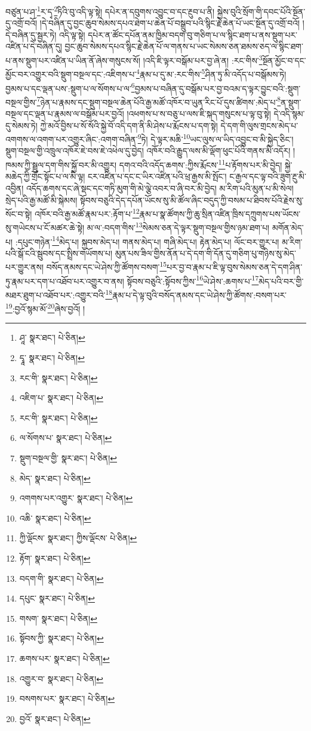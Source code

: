 བཙུན་པ་ཤ་\footnote{ཤཱ་  སྣར་ཐང་།  པེ་ཅིན། }ར་དྭ་\footnote{དྭཱ་  སྣར་ཐང་།  པེ་ཅིན། }ཏིའི་བུ་འདི་ལྟ་སྟེ། དཔེར་ན་དབུགས་འབྱུང་བ་དང་རྔུབ་པ་ནི། སྐྱེས་བུའི་སྲོག་གི་དབང་པོའི་སྔོན་དུ་འགྲོ་བའོ། །དེ་བཞིན་དུ་བྱང་ཆུབ་སེམས་དཔའ་ཐེག་པ་ཆེན་པོ་བསྒྲུབ་པའི་སྙིང་རྗེ་ཆེན་པོ་ཡང་སྔོན་དུ་འགྲོ་བའོ། །དེ་བཞིན་དུ་སྦྱར་ཏེ། འདི་ལྟ་སྟེ། དཔེར་ན་ཚོང་དཔོན་ནམ་ཁྱིམ་བདག་བུ་གཅིག་པ་ལ་སྙིང་ཐག་པ་ནས་སྡུག་པར་འཛིན་པ་དེ་བཞིན་དུ། བྱང་ཆུབ་སེམས་དཔའ་སྙིང་རྗེ་ཆེན་པོ་ལ་གནས་པ་ཡང་སེམས་ཅན་ཐམས་ཅད་ལ་སྙིང་ཐག་པ་ནས་སྡུག་པར་འཛིན་པ་ཡིན་ནོ་ཞེས་གསུངས་སོ། །འདི་ཇི་ལྟར་བསྒོམ་པར་བྱ་ཞེ་ན། :རང་གིས་\footnote{རང་གི་  སྣར་ཐང་།  པེ་ཅིན། }སྔོན་མྱོང་བ་དང་མྱོང་བར་འགྱུར་བའི་སྡུག་བསྔལ་དང་:འཇིགས་པ་\footnote{འཇིག་པ་  སྣར་ཐང་།  པེ་ཅིན། }རྣམ་པ་དུ་མ་:རང་གིས་\footnote{རང་གི་  སྣར་ཐང་།  པེ་ཅིན། }ཤིན་ཏུ་མི་འདོད་པ་བསྒོམས་ཏེ། བྱམས་པ་དང་ལྡན་པས་:སྡུག་པ་ལ་སོགས་པ་ལ་\footnote{ལ་སོགས་པ་  སྣར་ཐང་།  པེ་ཅིན། }བྱམས་པ་བཞིན་དུ་བསྒོམ་པར་བྱ་བའམ་ད་ལྟར་བྱུང་བའི་:སྡུག་བསྔལ་གྱིས་\footnote{སྡུག་བསྔལ་གྱི་  སྣར་ཐང་།  པེ་ཅིན། }ཉེན་པ་རྣམས་དང་སྡུག་བསྔལ་ཆེན་པོའི་རྒྱ་མཚོ་འཁོར་བ་ཡུན་རིང་པོ་དུས་ཚིགས་:མེད་པ་\footnote{མེད་  སྣར་ཐང་།  པེ་ཅིན། }ན་སྡུག་བསྔལ་དང་ལྡན་པ་རྣམས་ལ་བསྒོམ་པར་བྱའོ། །འཕགས་པ་ས་བཅུ་པ་ལས་ཇི་སྐད་གསུངས་པ་ལྟ་བུ་སྟེ། དེ་འདི་སྙམ་དུ་སེམས་ཏེ། ཀྱེ་མའོ་བྱིས་པ་སོ་སོའི་སྐྱེ་བོ་འདི་དག་ནི་མི་ཤེས་པ་རྨོངས་པ་དག་སྟེ། དེ་དག་གི་ལུས་གྲངས་མེད་པ་འགགས་ལ་འགག་པར་འགྱུར་ཞིང་:འགག་བཞིན་\footnote{འགགས་པར་འགྱུར་  སྣར་ཐང་།  པེ་ཅིན། }ཏེ། དེ་ལྟར་མཆི་\footnote{འཆི་  སྣར་ཐང་།  པེ་ཅིན། }ཡང་ལུས་ལ་ཡིད་འབྱུང་བ་མི་སྐྱེད་ཅིང་། སྡུག་བསྔལ་གྱི་འཁྲུལ་འཁོར་ཇེ་བས་ཇེ་འཕེལ་དུ་བྱེད། འཁོར་བའི་རྒྱུད་ལས་མི་ལྡོག་ཕུང་པོའི་གནས་མི་འདོར། །ཁམས་ཀྱི་སྦྲུལ་དག་གིས་སྐྱོ་བར་མི་འགྱུར། དགའ་བའི་འདོད་ཆགས་:ཀྱིས་རྨོངས་\footnote{ཀྱི་ལྡོངས་  སྣར་ཐང་། ཀྱིས་ལྡོངས་  པེ་ཅིན། }པ་རྟོགས་པར་མི་བྱེད། སྐྱེ་མཆེད་ཀྱི་གྲོང་སྟོང་པ་ལ་མི་ལྟ། ངར་འཛིན་པ་དང་ང་ཡིར་འཛིན་པའི་ཕྲ་རྒྱས་མི་སྤོང་། ང་རྒྱལ་དང་ལྟ་བའི་ཟུག་རྔུ་མི་འབྱིན། འདོད་ཆགས་དང་ཞེ་སྡང་དང་གཏི་མུག་གི་མེ་ལྕེ་འབར་བ་ཞི་བར་མི་བྱེད། མ་རིག་པའི་མུན་པ་མི་སེལ། སྲེད་པའི་རྒྱ་མཚོ་མི་སྐེམས། སྟོབས་བཅུའི་དེད་དཔོན་ཡོངས་སུ་མི་ཚོལ་ཞིང་བདུད་ཀྱི་བསམ་པ་ཐིབས་པོའི་རྗེས་སུ་སོང་བ་སྟེ། འཁོར་བའི་རྒྱ་མཚོ་རྣམ་པར་:རྟོག་པ་\footnote{རྟོག་  སྣར་ཐང་།  པེ་ཅིན། }རྣམ་པ་སྣ་ཚོགས་ཀྱི་ཆུ་སྲིན་འཛིན་ཁྲིས་དཀྲུགས་པས་ཡོངས་སུ་གཡེངས་པ་ངོ་མཚར་ཆེ་སྟེ། མ་ལ་:བདག་གིས་\footnote{བདག་གི་  སྣར་ཐང་།  པེ་ཅིན། }སེམས་ཅན་དེ་ལྟར་སྡུག་བསྔལ་གྱིས་ཉམ་ཐག་པ། མགོན་མེད་པ། :དཔུང་གཉེན་\footnote{དཔུང་  སྣར་ཐང་།  པེ་ཅིན། }མེད་པ། སྐྱབས་མེད་པ། གནས་མེད་པ། གཞི་མེད་པ། རྟེན་མེད་པ། ལོང་བར་གྱུར་པ། མ་རིག་པའི་སྒོ་ངའི་སྦུབས་དང་སྤྲིས་གཡོགས་པ། མུན་པས་ཟིལ་གྱིས་ནོན་པ་དེ་དག་གི་དོན་དུ་གཅིག་པུ་གཉིས་སུ་མེད་པར་གྱུར་ནས། བསོད་ནམས་དང་ཡེ་ཤེས་ཀྱི་ཚོགས་བསག་\footnote{གསག་  སྣར་ཐང་།  པེ་ཅིན། }པར་བྱ་བ་རྣམ་པ་ཇི་ལྟ་བུས་སེམས་ཅན་དེ་དག་ཤིན་ཏུ་རྣམ་པར་དག་པ་འཐོབ་པར་འགྱུར་བ་ནས། སྟོབས་བཅུའི་:སྟོབས་ཀྱིས་\footnote{སྟོབས་ཀྱི་  སྣར་ཐང་།  པེ་ཅིན། }ཡེ་ཤེས་:ཆགས་པ་\footnote{ཆགས་པར་  སྣར་ཐང་།  པེ་ཅིན། }མེད་པའི་བར་གྱི་མཐར་ཐུག་པ་འཐོབ་པར་:འགྱུར་བའི་\footnote{འགྱུར་བ་  སྣར་ཐང་།  པེ་ཅིན། }རྣམ་པ་དེ་ལྟ་བུའི་བསོད་ནམས་དང་ཡེ་ཤེས་ཀྱི་ཚོགས་:བསག་པར་\footnote{བསགས་པར་  སྣར་ཐང་།  པེ་ཅིན། }:བྱའོ་སྙམ་མོ་\footnote{བྱའོ་  སྣར་ཐང་།  པེ་ཅིན། }ཞེས་བྱའོ། །
